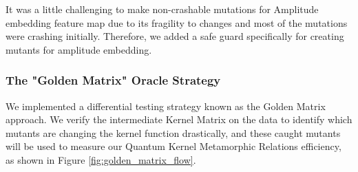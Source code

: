 \documentclass[12pt,a4paper]{article}
\begin{document}
	It was a little challenging to make non-crashable mutations for Amplitude embedding feature map due to its fragility to changes and most of the mutations were crashing initially. Therefore, we added a safe guard specifically for creating mutants for amplitude embedding. 
	
	\subsubsection{The "Golden Matrix" Oracle Strategy}
	We implemented a differential testing strategy \cite{mckeeman1998} known as the Golden Matrix approach. We verify the intermediate Kernel Matrix \cite{wang2021} on the data to identify which mutants are changing the kernel function drastically, and these caught mutants will be used to measure our Quantum Kernel Metamorphic Relations efficiency, as shown in Figure \ref{fig:golden_matrix_flow}.
	
\end{document}

